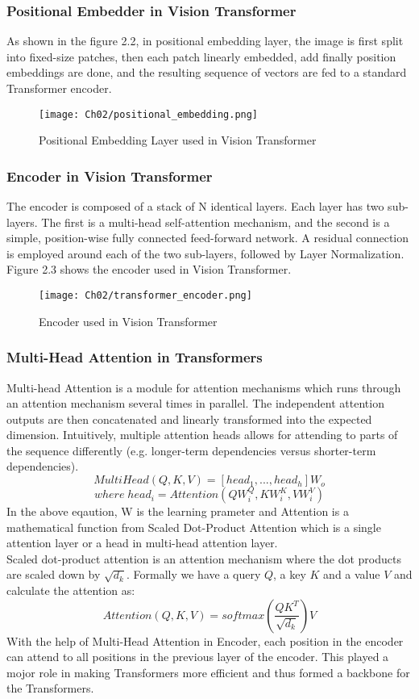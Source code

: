 \subsubsection{Positional Embedder in Vision Transformer}
As shown in the figure 2.2, in positional embedding layer, the image is first split into fixed-size patches, then each patch linearly embedded,
add finally position embeddings are done, and the resulting sequence of vectors are fed to a standard Transformer encoder.
\begin{figure}[h]
    \centering
    \texttt{[image: Ch02/positional\_embedding.png]}
    \caption{Positional Embedding Layer used in Vision Transformer}
    \label{figure:3}
\end{figure}
\FloatBarrier

\subsubsection{Encoder in Vision Transformer}
The encoder is composed of a stack of N identical layers. Each layer has two sub-layers. The first is a multi-head self-attention mechanism, and the second is a simple, position-wise fully connected feed-forward network. A residual connection is employed around each of the two sub-layers, followed by Layer Normalization\cite{ba2016layer}.
\\
Figure 2.3 shows the encoder used in Vision Transformer.
\begin{figure}[h]
    \centering
    \texttt{[image: Ch02/transformer\_encoder.png]}
    \caption{Encoder used in Vision Transformer}
    \label{figure:4}
\end{figure}
\FloatBarrier

\subsubsection{Multi-Head Attention in Transformers}
Multi-head Attention is a module for attention mechanisms which runs through an attention mechanism several times in parallel. The independent attention outputs are then concatenated and linearly transformed into the expected dimension. Intuitively, multiple attention heads allows for attending to parts of the sequence differently (e.g. longer-term dependencies versus shorter-term dependencies).
\[ MultiHead(Q, K, V) = [head_1,...,head_h]W_o \]
\[ where \; head_i = Attention(QW_i^Q, KW_i^K, VW_i^V) \]
In the above eqaution, W is the learning prameter and Attention is a mathematical function from Scaled Dot-Product Attention which is a single attention layer or a head in multi-head attention layer.
\\
Scaled dot-product attention is an attention mechanism where the dot products are scaled down by \(\sqrt{d_k}\). Formally we have a query \(Q\), a key \(K\) and a value \(V\) and calculate the attention as:
\[ Attention(Q,K,V) = softmax\left(\frac{QK^T}{\sqrt{d_k}}\right)V \]
With the help of Multi-Head Attention in Encoder, each position in the encoder can attend to all positions in the previous layer of the encoder. This played a mojor role in making Transformers more efficient and thus formed a backbone for the Transformers.

